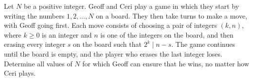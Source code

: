 Let $N$ be a positive integer. Geoff and Ceri play a game in which they start by writing the numbers $1, 2, \ldots, N$ on a board. They then take turns to make a move, with Geoff going first. Each move consists of choosing a pair of integers $(k, n)$, where $k \geq 0$ is an integer and $n$ is one of the integers on the board, and then erasing every integer $s$ on the board such that $2^k \mid n - s$. The game continues until the board is empty, and the player who erases the last integer loses. Determine all values of $N$ for which Geoff can ensure that he wins, no matter how Ceri plays.
